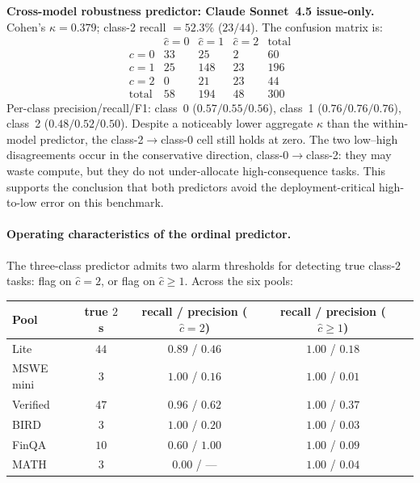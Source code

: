 \documentclass{article}
\begin{document}
\textbf{Cross-model robustness predictor: Claude Sonnet~4.5
issue-only.} Cohen's $\kappa = 0.379$; class-2 recall $= 52.3\%$
($23/44$). The confusion matrix is:
\[
\begin{array}{c|ccc|c}
& \hat{c}{=}0 & \hat{c}{=}1 & \hat{c}{=}2 & \text{total} \\\hline
c{=}0 & 33 & 25 & 2 & 60 \\
c{=}1 & 25 & 148 & 23 & 196 \\
c{=}2 & 0 & 21 & 23 & 44 \\\hline
\text{total} & 58 & 194 & 48 & 300
\end{array}
\]
Per-class precision/recall/F1: class~0 ($0.57/0.55/0.56$), class~1
($0.76/0.76/0.76$), class~2 ($0.48/0.52/0.50$). Despite a noticeably
lower aggregate $\kappa$ than the within-model predictor, the
class-2$\to$class-0 cell still holds at zero. The two low--high
disagreements occur in the conservative direction, class-0$\to$class-2:
they may waste compute, but they do not under-allocate high-consequence
tasks. This supports the conclusion that both predictors avoid the
deployment-critical high-to-low error on this benchmark.

\paragraph{Operating characteristics of the ordinal predictor.} The
three-class predictor admits two alarm thresholds for detecting true
class-$2$ tasks: flag on $\hat{c}{=}2$, or flag on
$\hat{c}{\ge}1$. Across the six pools:

\begin{center}
\small
\begin{tabular}{lcccc}
\toprule
Pool & true $2$s & recall / precision ($\hat{c}{=}2$) & recall / precision ($\hat{c}{\ge}1$) \\
\midrule
Lite      & $44$ & $0.89$ / $0.46$ & $1.00$ / $0.18$ \\
MSWE mini & $3$  & $1.00$ / $0.16$ & $1.00$ / $0.01$ \\
Verified  & $47$ & $0.96$ / $0.62$ & $1.00$ / $0.37$ \\
BIRD      & $3$  & $1.00$ / $0.20$ & $1.00$ / $0.03$ \\
FinQA     & $10$ & $0.60$ / $1.00$ & $1.00$ / $0.09$ \\
MATH      & $3$  & $0.00$ / --- & $1.00$ / $0.04$ \\
\bottomrule
\end{tabular}
\end{center}
\end{document}
